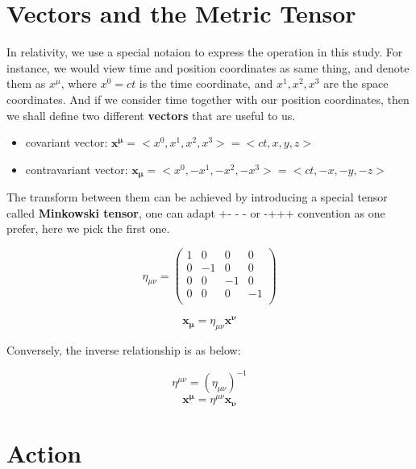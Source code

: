 \documentclass[12pt]{article}
\begin{document}
\section{Vectors and the Metric Tensor}

In relativity, we use a special notaion to express the operation in this study. For instance, we would view time and position coordinates as same thing, and denote them as $x^{\mu}$, where $x^0 = ct$ is the time coordinate, and $x^1, x^2, x^3$ are the space coordinates. 
And if we consider time together with our position coordinates, then we shall define two different \textbf{vectors} that are useful to us.

\begin{itemize}
    \item covariant vector: $\mathbf{x^{\mu}} = <x^0, x^1, x^2, x^3> = <ct, x, y, z>$
    \item contravariant vector: $\mathbf{x_{\mu}} = <x^0, -x^1, -x^2, -x^3> = <ct, -x, -y, -z>$
\end{itemize}

The transform between them can be achieved by introducing a special tensor called \textbf{Minkowski tensor}, one can adapt +- - - or -+++ convention as one prefer, here we pick the first one. 

\begin{center}
    \[ \eta_{\mu \nu} = 
    \begin{pmatrix}
        1&0&0&0\\
        0&-1&0&0\\
        0&0&-1&0\\
        0&0&0&-1\\
    \end{pmatrix} \]
\end{center}

\begin{center}
    \[ \mathbf{x_{\mu}} = \eta_{\mu \nu} \mathbf{x^{\nu}} \]
\end{center}

Conversely, the inverse relationship is as below:

\begin{center}
    \[ \eta^{\mu \nu} = (\eta_{\mu \nu})^{-1}\]
    \[ \mathbf{x^{\mu}} = \eta^{\mu \nu} \mathbf{x_{\nu}} \]
\end{center}

\section{Action}
\end{document}
